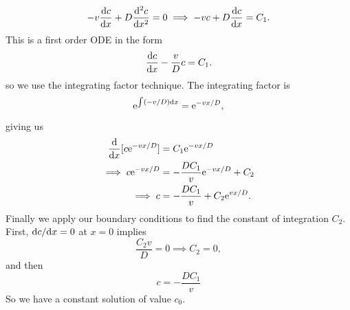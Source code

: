 \documentclass[a4paper, 12pt]{article}
\begin{document}
\begin{enumerate}[label={\bf \arabic{*}.\;}, ref={\arabic{*}},itemsep=3ex, left=0ex]
{\begin{enumerate}[label=(\alph*)]
{\begin{equation}
              -v\fd{c}{x} + D\fdd{c}{x} = 0 \implies -v c + D\fd{c}{x} = C_1.
            \end{equation}
            This is a first order ODE in the form
            \begin{equation}
              \label{fov1}
              \fd{c}{x} - \frac{v}{D}c = C_1.
            \end{equation}
            so we use the integrating factor technique. The integrating factor is
            \begin{equation}
              \mathrm{e}^{\int(-v/D){\mathrm d} x} = \mathrm{e}^{-vx/D},
            \end{equation}
            giving us
            \begin{align}
              \fd{}{x}[c\e^{-vx/D}] & = C_1\e^{-vx/D}\\
              \implies c\e^{-vx/D} &= -\frac{DC_1}{v}\e^{-vx/D} + C_2\\
              \implies c &= -\frac{DC_1}{v} + C_2\e^{vx/D}.
            \end{align}
            Finally we apply our boundary conditions to find the constant of integration $C_2$. First, $\fd{c}{x}=0$ at $x=0$ implies
            \begin{equation}
              \frac{C_2 v}{D}  = 0 \implies C_2 = 0,
            \end{equation}
            and then
            \begin{equation}
              c = -\frac{DC_1}{v}
            \end{equation}
            So we have a constant solution of value $c_0$.
          }
      \end{enumerate}

    }



\end{enumerate}
\end{document}

